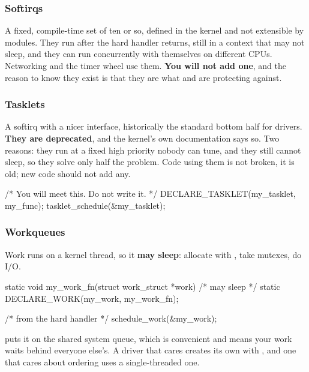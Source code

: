 \subsubsection{Softirqs}
\label{c8:app:b:softirqs}

A fixed, compile-time set of ten or so, defined in the kernel and not extensible by modules. They
run after the hard handler returns, still in a context that may not sleep, and they can run
concurrently with themselves on different CPUs. Networking and the timer wheel use them. \textbf{You
will not add one}, and the reason to know they exist is that they are what 
and  are protecting against.

\subsubsection{Tasklets}
\label{c8:app:b:tasklets}

A softirq with a nicer interface, historically the standard bottom half for drivers. \textbf{They
are deprecated}, and the kernel's own documentation says so. Two reasons: they run at a fixed high
priority nobody can tune, and they still cannot sleep, so they solve only half the problem. Code
using them is not broken, it is old; new code should not add any.

\begin{ccode}
/* You will meet this. Do not write it. */
DECLARE_TASKLET(my_tasklet, my_func);
tasklet_schedule(&my_tasklet);
\end{ccode}

\subsubsection{Workqueues}
\label{c8:app:b:workqueues}

Work runs on a kernel thread, so it \textbf{may sleep}: allocate with , take
mutexes, do I/O.

\begin{ccode}
static void my_work_fn(struct work_struct *work) { /* may sleep */ }
static DECLARE_WORK(my_work, my_work_fn);

/* from the hard handler */
schedule_work(&my_work);
\end{ccode}

\noindent {} puts it on the shared system queue, which is convenient and means
your work waits behind everyone else's. A driver that cares creates its own with
, and one that cares about ordering uses a single-threaded one.

